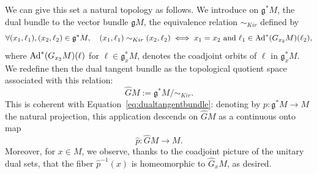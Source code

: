 \documentclass[12pt,a4paper]{amsart}
\theoremstyle{plain}
\theoremstyle{definition}
\theoremstyle{remark}
\numberwithin{equation}{section}
\theoremstyle{definition}
\def \Ghat{\widehat{G}}
\def \fg{\mathfrak{g}}
\numberwithin{equation}{section}
\begin{document}
We can give this set a natural topology as follows. We introduce on $\fg^* M$, the dual bundle to the vector bundle $\fg M$, the equivalence relation $\sim_{Kir}$ defined by 
\begin{equation*}
    \forall (x_1,\ell_1),(x_2,\ell_2)\in \fg^* M,\quad
    (x_1,\ell_1)\sim_{Kir}(x_2,\ell_2) \iff x_1 = x_2\ \mbox{and}\ \ell_1 \in {\rm Ad}^*(G_{x_2} M)(\ell_2),
\end{equation*}
where ${\rm Ad}^*(G_{x_2} M)(\ell)$ for $\ell \in \fg_{x}^* M$, denotes the coadjoint orbits of $\ell$ in $\fg_{x}^* M$.
We redefine then the dual tangent bundle as the topological quotient space associated with this relation:
\begin{equation*}
    \Ghat M := \fg^* M /\sim_{Kir}.
\end{equation*}
This is coherent with Equation~\eqref{eq:dualtangentbundle}: denoting by $p:\fg^* M\rightarrow M$ the natural projection, this application descends on $\Ghat M$ as a continuous onto map
\begin{equation*}
    \hat{p}:\Ghat M \rightarrow M.
\end{equation*}
Moreover, for $x\in M$, we observe, thanks to the coadjoint picture of the unitary dual sets, that the fiber $\hat{p}^{-1}(x)$ is homeomorphic to $\Ghat_x M$, as desired.

\vspace{0.25cm}
\end{document}

